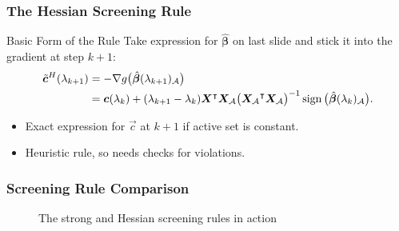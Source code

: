 \documentclass[10pt]{beamer}
\begin{document}
\begin{frame}
  \frametitle{The Hessian Screening Rule}

  \begin{block}{Basic Form of the Rule}
    Take expression for \(\hat{\bm{\beta}}\) on last slide and stick it into the gradient at step \(k +
    1\):
    \begin{equation*}
      \begin{aligned}
        \tilde{\bm{c}}^H(\lambda_{k+1})
         & = -\nabla g\big(\hat{\bm{\beta}}(\lambda_{k+1})_\mathcal{A}\big)                      \\
         & = \bm{c}(\lambda_k) + (\lambda_{k+1} - \lambda_k)\bm{X}^\intercal {\bm{X}_\mathcal{A}}
        \big({\bm{X}_\mathcal{A}}^\intercal \bm{X}_\mathcal{A}\big)^{-1}
        \operatorname{sign}\big(\hat{\bm{\beta}}(\lambda_k)_\mathcal{A}\big).
      \end{aligned}
    \end{equation*}
  \end{block}

  \pause

  \begin{itemize}
    \item Exact expression for \(\vec{c}\) at \(k+1\) if active set is constant.\medskip
    \item Heuristic rule, so needs checks for violations.
  \end{itemize}

\end{frame}

\begin{frame}[c]
  \frametitle{Screening Rule Comparison}

  \begin{figure}[tpb]
    \centering
    \pgfplotsset{width=9cm,height=7cm}
    
    \caption{%
      The strong and Hessian screening rules in action
    }
  \end{figure}
\end{frame}
\end{document}
